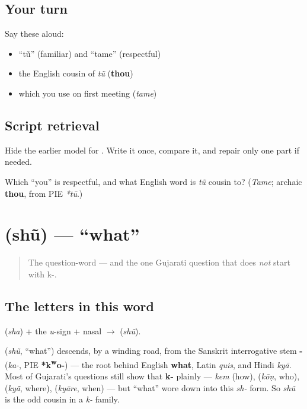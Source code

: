 \subsection*{Your turn}
Say these aloud:

\begin{itemize}
\raggedright
  \item \textquotedblleft{}tũ\textquotedblright{} (familiar) and \textquotedblleft{}tame\textquotedblright{} (respectful)
  \item the English cousin of \emph{tũ} (\textbf{thou})
  \item which you use on first meeting (\emph{tame})
\end{itemize}

\subsection*{Script retrieval}
Hide the earlier model for \textbf{}. Write it once, compare it, and repair only one part if needed.

\begin{tcolorbox}[breakable,colback=teal!4,colframe=teal!35!black,title={Before you move on}]
Which \textquotedblleft{}you\textquotedblright{} is respectful, and what English word is \emph{tũ} cousin to? (\emph{Tame}; archaic \textbf{thou}, from PIE \emph{*tū}.)
\end{tcolorbox}
\section[\gu{શું}]{ (shũ) — \textquotedblleft{}what\textquotedblright{}}

\label{lesson:GU-C02-shun}



\begin{quote}
The question-word — and the one Gujarati question that does \emph{not} start with k-.
\end{quote}

\subsection*{The letters in this word}
\textbf{} (\emph{sha}) + the \emph{u}-sign + nasal $\to$ \textbf{} (\emph{shũ}).

\begin{cousinweb}
\textbf{} (\emph{shũ}, \textquotedblleft{}what\textquotedblright{}) descends, by a winding road, from the Sanskrit interrogative stem \textbf{-} (\emph{ka-}, PIE \textbf{*k\textsuperscript{w}o-}) — the root behind English \textbf{what}, Latin \emph{quis}, and Hindi \emph{kyā}. Most of Gujarati's questions still show that \textbf{k-} plainly — \emph{kem} (how), \textbf{} (\emph{kōṇ}, who), \textbf{} (\emph{kyā̃}, where), \textbf{} (\emph{kyāre}, when) — but \textquotedblleft{}what\textquotedblright{} wore down into this \emph{sh-} form. So \emph{shũ} is the odd cousin in a \emph{k-} family.
\end{cousinweb}

